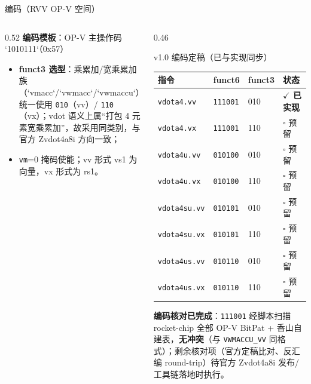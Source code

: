 \documentclass[aspectratio=169]{beamer}
\newcommand{\smalltable}[1]{\par\centering\scriptsize #1\par}
\begin{document}
\begin{frame}{编码（RVV OP-V 空间）}
\begin{columns}[T]
\begin{column}{0.52\textwidth}
\textbf{编码模板}：OP-V 主操作码 `1010111`（0x57）
\begin{center}
\scriptsize
{}
\end{center}
\begin{itemize}
  \item \textbf{funct3 选型}：乘累加/宽乘累加族（`vmacc`/`vwmacc`/`vwmaccu`）统一使用 \texttt{010}（vv）/ \texttt{110}（vx）；vdot 语义上属“打包 4 元素宽乘累加”，故采用同类别，与官方 Zvdot4a8i 方向一致；
  \item \texttt{vm}=0 掩码使能；vv 形式 vs1 为向量，vx 形式为 rs1。
\end{itemize}
\end{column}
\begin{column}{0.46\textwidth}
\begin{block}{v1.0 编码定稿（已与实现同步）}
\smalltable{%
\begin{tabular}{@{}llll@{}}
\toprule
指令 & funct6 & funct3 & 状态 \\
\midrule
\texttt{vdota4.vv} & \texttt{111001} & 010 & \cellcolor{GreenOK!25}\textbf{$\checkmark$ 已实现} \\
\texttt{vdota4.vx} & \texttt{111001} & 110 & $\square$ 预留 \\
\texttt{vdota4u.vv} & \texttt{010100} & 010 & $\square$ 预留 \\
\texttt{vdota4u.vx} & \texttt{010100} & 110 & $\square$ 预留 \\
\texttt{vdota4su.vv} & \texttt{010101} & 010 & $\square$ 预留 \\
\texttt{vdota4su.vx} & \texttt{010101} & 110 & $\square$ 预留 \\
\texttt{vdota4us.vv} & \texttt{010110} & 010 & $\square$ 预留 \\
\texttt{vdota4us.vx} & \texttt{010110} & 110 & $\square$ 预留 \\
\bottomrule
\end{tabular}}
\end{block}
\textbf{编码核对已完成}：\texttt{111001} 经脚本扫描 rocket-chip 全部 OP-V BitPat + 香山自建表，\textbf{无冲突}（与 \texttt{VWMACCU\_VV} 同格式）；剩余核对项（官方定稿比对、反汇编 round-trip）待官方 Zvdot4a8i 发布/工具链落地时执行。
\end{column}
\end{columns}
\end{frame}
\end{document}
